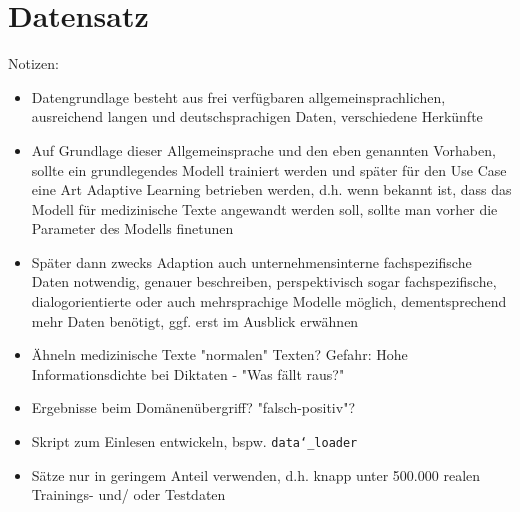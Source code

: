 \section{Datensatz}
Notizen:
\begin{itemize}
	\item Datengrundlage besteht aus frei verfügbaren allgemeinsprachlichen, ausreichend langen und deutschsprachigen Daten, verschiedene Herkünfte
	\item Auf Grundlage dieser Allgemeinsprache und den eben genannten Vorhaben, sollte ein grundlegendes Modell trainiert werden und später für den Use Case eine Art Adaptive Learning betrieben werden, d.h. wenn bekannt ist, dass das Modell für medizinische Texte angewandt werden soll, sollte man vorher die Parameter des Modells finetunen
	\item Später dann zwecks Adaption auch unternehmensinterne fachspezifische Daten notwendig, genauer beschreiben, perspektivisch sogar fachspezifische, dialogorientierte oder auch mehrsprachige Modelle möglich, dementsprechend mehr Daten benötigt, ggf. erst im Ausblick erwähnen
	\item Ähneln medizinische Texte "normalen" Texten? Gefahr: Hohe Informationsdichte bei Diktaten - "Was fällt raus?"
	\item Ergebnisse beim Domänenübergriff? "falsch-positiv"?
	\item Skript zum Einlesen entwickeln, bspw. \texttt{data\char`_loader}
	\item Sätze nur in geringem Anteil verwenden, d.h. knapp unter 500.000 realen Trainings- und/ oder Testdaten
\end{itemize}
